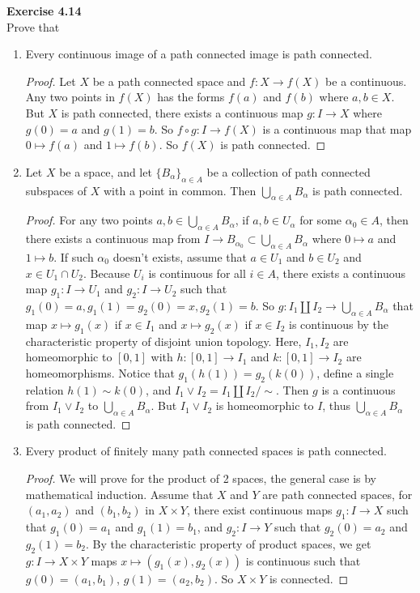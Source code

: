 \documentclass[12pt, a4paper]{article}
\theoremstyle{plain}
\newenvironment{exercise}[2][Exercise]
    { \begin{mdframed}[backgroundcolor=gray!20] \textbf{#1 #2} \\}
    {  \end{mdframed}}
\begin{document}
\begin{exercise}{4.14}
Prove that
\begin{enumerate}[label=(\alph*)]
\item Every continuous image of a path connected image is path connected.
	\begin{proof}
	Let $X$ be a path connected space and $f:X\rightarrow f(X)$ be a continuous. Any two points in $f(X)$ has the forms $f(a)$ and $f(b)$ where $a,b\in X$. But $X$ is path connected, there exists a continuous map $g:I\rightarrow X$ where $g(0)=a$ and $g(1)=b$. So $f\circ g:I\rightarrow f(X)$ is a continuous map that map $0\mapsto f(a)$ and $1\mapsto f(b)$. So $f(X)$ is path connected.
	\end{proof}
\item Let $X$ be a space, and let $\{B_\alpha\}_{\alpha\in A}$ be a collection of path connected subspaces of $X$ with a point in common. Then $\bigcup_{\alpha \in A}B_\alpha$ is path connected.
	\begin{proof}
	For any two points $a,b\in\bigcup_{\alpha\in A}B_\alpha$, if $a,b\in U_\alpha$ for some $\alpha_0\in A$, then there exists a continuous map from $I\rightarrow B_{\alpha_0}\subset\bigcup_{\alpha\in A}B_\alpha$ where $0\mapsto a$ and $1\mapsto b$. If such $\alpha_0$ doesn't exists, assume that $a\in U_1$ and $b\in U_2$ and $x\in U_1\cap U_2$. Because $U_i$ is continuous for all $i\in A$, there exists a continuous map $g_1:I\rightarrow U_1$ and $g_2:I\rightarrow U_2$ such that $g_1(0)=a,g_1(1)=g_2(0)=x,g_2(1)=b$. So $g:I_1\coprod I_2\rightarrow \bigcup_{\alpha\in A}B_\alpha$ that map $x\mapsto g_1(x)$ if $x\in I_1$ and $x\mapsto g_2(x)$ if $x\in I_2$ is continuous by the characteristic property of disjoint union topology. Here, $I_1, I_2$ are homeomorphic to $[0,1]$ with $h:[0,1]\rightarrow I_1$ and $k:[0,1]\rightarrow I_2$ are homeomorphisms. Notice that $g_1(h(1))=g_2(k(0))$, define a single relation $h(1)\sim k(0)$, and $I_1\vee I_2=I_1\coprod I_2/\sim$. Then $g$ is a continuous from $I_1\vee I_2$ to $\bigcup_{\alpha\in A}B_\alpha$. But $I_1\vee I_2$ is homeomorphic to $I$, thus $\bigcup_{\alpha\in A}B_\alpha$ is path connected.
	\end{proof}
\item Every product of finitely many path connected spaces is path connected.
	\begin{proof}
	We will prove for the product of 2 spaces, the general case is by mathematical induction. Assume that $X$ and $Y$ are path connected spaces, for $(a_1,a_2)$ and $(b_1,b_2)$ in $X\times Y$, there exist continuous maps $g_1:I\rightarrow X$ such that $g_1(0)=a_1$ and $g_1(1)=b_1$, and $g_2:I\rightarrow Y$ such that $g_2(0)=a_2$ and $g_2(1)=b_2$. By the characteristic property of product spaces, we get $g:I\rightarrow X\times Y$ maps $x\mapsto (g_1(x),g_2(x))$ is continuous such that $g(0)=(a_1,b_1)$, $g(1)=(a_2,b_2)$. So $X\times Y$ is connected.

\end{proof}
\end{enumerate}
\end{exercise}
\end{document}
